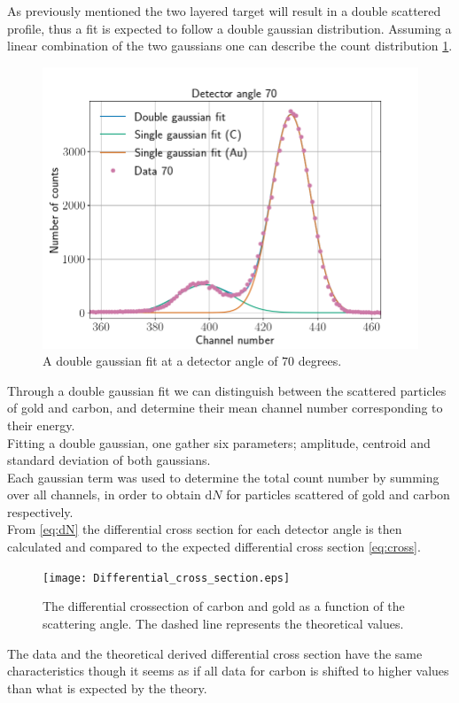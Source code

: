 As previously mentioned  the two layered target will result in a double
scattered profile, thus a fit is expected to follow a double gaussian
distribution. Assuming a linear combination of the two gaussians one can
describe the count distribution \cref{fig_doublegauss}.\\
\begin{figure}[h]
\centering
\includegraphics[width=0.99\columnwidth]{Data_70}
\caption{A double gaussian fit at a detector angle of $70$ degrees.}
\label{fig_doublegauss}
\end{figure}
Through a double gaussian fit we can distinguish between the scattered particles of gold and carbon, and determine their mean channel number corresponding to their energy.  \\
Fitting a double gaussian, one gather six parameters; amplitude, centroid and standard deviation
of both gaussians.  \\
Each gaussian term was used to determine the total count number by summing over
all channels, in order to obtain $\mathrm{d}N$ for particles scattered of gold
and carbon respectively.\\
%
From \cref{eq:dN} the differential cross section for each detector angle is
then calculated and compared to the expected differential cross section
\cref{eq:cross}.\\
\begin{figure}[b]
	\centering
		\texttt{[image: Differential\_cross\_section.eps]}
	\caption{The differential crossection  of carbon and gold as a function of the scattering angle. The dashed line represents the theoretical values.}
	\label{fig:Differential_cross_section}
\end{figure}
The data and the theoretical derived differential cross section have the same
characteristics though it seems as if all data for carbon is shifted to higher
values than what is expected by the theory.

